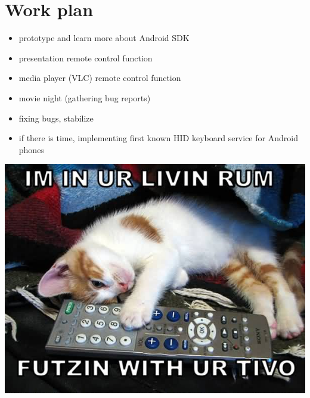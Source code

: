 \documentclass[ddc nogerman]{tudbeamer}
\begin{document}
\section{Work plan}
\begin{frame}
    \begin{itemize}
        \item prototype and learn more about Android SDK
        \\ \hfill
        \item presentation remote control function
        \item media player (VLC) remote control function
        \item movie night (gathering bug reports)
        \item fixing bugs, stabilize
        \\ \hfill
        \item if there is time, implementing first known HID keyboard service
            for Android phones
    \end{itemize}
\end{frame}

\begin{frame}
    \includegraphics[height=\textheight]{img/endcat.jpg}
\end{frame}
\end{document}
